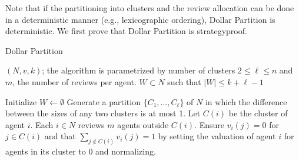 \documentclass[letterpaper]{article}
\renewcommand{\algorithmicrequire}{\textbf{Input:}}
\renewcommand{\algorithmicensure}{\textbf{Output:}}
\newlength{\wordlength}
\newcommand{\wordbox}[3][c]{\settowidth{\wordlength}{#3}\makebox[\wordlength][#1]{#2}}
\begin{document}
	
	
Note that if the partitioning into clusters and the review allocation can be done in a deterministic manner (e.g., lexicographic ordering), Dollar Partition is deterministic. We first prove that Dollar Partition is strategyproof.




		\begin{algorithm}[ht!]
		 \caption{Dollar Partition}
		 \label{algo:DP}
		\renewcommand{\algorithmicrequire}{\wordbox[l]{\textbf{Input}:}{\textbf{Output}:}} 
		 \renewcommand{\algorithmicensure}{\wordbox[l]{\textbf{Output}:}{\textbf{Output}:}}
		\footnotesize
		\begin{algorithmic}
			\footnotesize
			\REQUIRE $(N,v,k)$; the algorithm is parametrized by number of clusters $2\leq \ell\leq n$ and $m$, the number of reviews per agent.
			\ENSURE $W\subset N$ such that $|W|\leq k+\ell-1$
		\end{algorithmic}
		 \begin{algorithmic}[1] 
				\footnotesize
		
			 \STATE Initialize $W\longleftarrow \emptyset$
			 \STATE Generate a partition $\{C_1,\ldots, C_{\ell}\}$ of $N$ in which the difference between the sizes of any two clusters is at most 1. Let $C(i)$ be the cluster of agent $i$. %
			 \STATE 
			 Each $i\in N$ reviews $m$ agents outside $C(i)$.
			 Ensure $v_i(j)=0$ for $j\in C(i)$ and that $\sum_{j\notin C(i)}v_i(j)=1$ by setting the valuation of agent $i$ for agents in its cluster to $0$ and normalizing.
			 	 

\end{algorithmic}
\end{algorithm}
\end{document}
